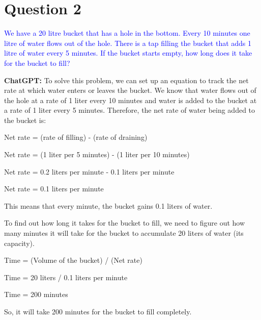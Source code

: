 \documentclass[11pt]{article} %
\begin{document}
\section{Question 2}
\textcolor{blue}{We have a 20 litre bucket that has a hole in the bottom. Every 10 minutes one litre of water flows out of the hole. There is a tap filling the bucket that adds 1 litre of water every 5 minutes. If the bucket starts empty, how long does it take for the bucket to fill?}

\begin{mdframed}[
        backgroundcolor=white,  %
        linecolor=black,        %
        leftmargin=5pt,         %
        rightmargin=5pt,        %
        linewidth=2pt           %
    ]
    \textbf{ChatGPT: } To solve this problem, we can set up an equation to track the net rate at which water enters or leaves the bucket. We know that water flows out of the hole at a rate of 1 liter every 10 minutes and water is added to the bucket at a rate of 1 liter every 5 minutes. Therefore, the net rate of water being added to the bucket is:

    Net rate = (rate of filling) - (rate of draining)

    Net rate = (1 liter per 5 minutes) - (1 liter per 10 minutes)

    Net rate = 0.2 liters per minute - 0.1 liters per minute

    Net rate = 0.1 liters per minute

    This means that every minute, the bucket gains 0.1 liters of water.

    To find out how long it takes for the bucket to fill, we need to figure out how many minutes it will take for the bucket to accumulate 20 liters of water (its capacity).

    Time = (Volume of the bucket) / (Net rate)

    Time = 20 liters / 0.1 liters per minute

    Time = 200 minutes

    So, it will take 200 minutes for the bucket to fill completely.

\end{mdframed}
\end{document}
